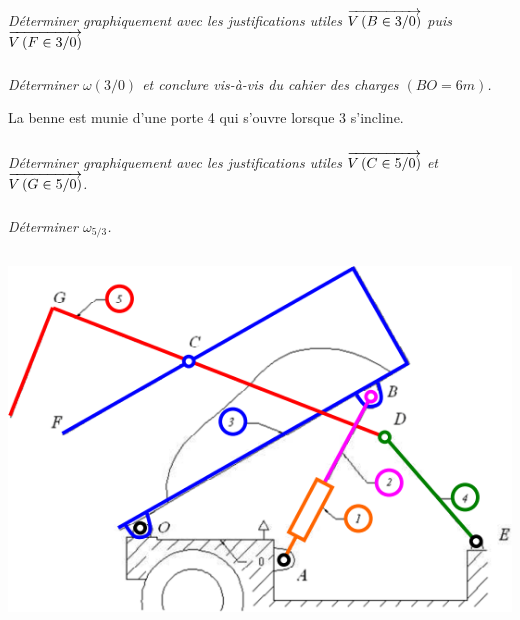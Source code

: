 \documentclass[10pt,fleqn]{article} %
\begin{document}
\begin{multicols}{2}
\subparagraph{}
\textit{Déterminer graphiquement avec les justifications utiles $\overrightarrow{V\left( {B} \in {3}/{0}\right)}$ puis $\overrightarrow{V\left( {F} \in {3}/{0}\right)}$}


\subparagraph{}
\textit{Déterminer $\omega(3/0)$ et conclure vis-à-vis du cahier des charges $(BO=6m)$.}

La benne est munie d'une porte 4 qui s'ouvre lorsque 3 s'incline.


\subparagraph{}
\textit{Déterminer graphiquement avec les justifications utiles $\overrightarrow{V\left( {C} \in {5}/{0}\right)}$ et $\overrightarrow{V\left( {G} \in {5}/{0}\right)}$.}


\subparagraph{}
\textit{Déterminer $\omega_{5/3}$.}



\end{multicols}



%
%
%
\newpage
$$ \quad $$
\vspace{6cm}

\begin{center}
\includegraphics[width=.75\textwidth]{images/fig4}
\end{center}
\end{document}
